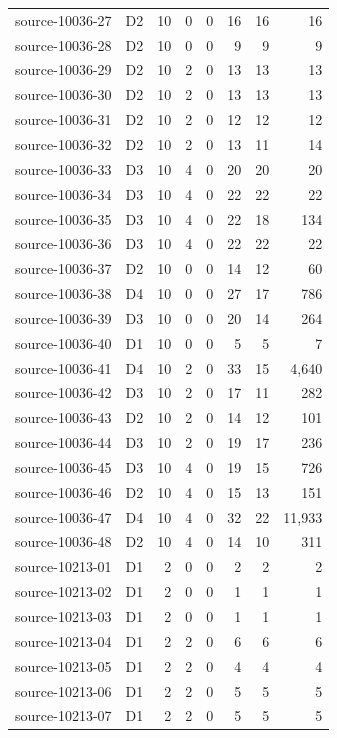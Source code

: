 \begin{longtable}{p{}lrrrrrr}
source-10036-27 & D2 & 10 & 0 & 0 & 16 & 16 & 16\\
source-10036-28 & D2 & 10 & 0 & 0 & 9 & 9 & 9\\
source-10036-29 & D2 & 10 & 2 & 0 & 13 & 13 & 13\\
source-10036-30 & D2 & 10 & 2 & 0 & 13 & 13 & 13\\
source-10036-31 & D2 & 10 & 2 & 0 & 12 & 12 & 12\\
source-10036-32 & D2 & 10 & 2 & 0 & 13 & 11 & 14\\
source-10036-33 & D3 & 10 & 4 & 0 & 20 & 20 & 20\\
source-10036-34 & D3 & 10 & 4 & 0 & 22 & 22 & 22\\
source-10036-35 & D3 & 10 & 4 & 0 & 22 & 18 & 134\\
source-10036-36 & D3 & 10 & 4 & 0 & 22 & 22 & 22\\
source-10036-37 & D2 & 10 & 0 & 0 & 14 & 12 & 60\\
source-10036-38 & D4 & 10 & 0 & 0 & 27 & 17 & 786\\
source-10036-39 & D3 & 10 & 0 & 0 & 20 & 14 & 264\\
source-10036-40 & D1 & 10 & 0 & 0 & 5 & 5 & 7\\
source-10036-41 & D4 & 10 & 2 & 0 & 33 & 15 & 4,640\\
source-10036-42 & D3 & 10 & 2 & 0 & 17 & 11 & 282\\
source-10036-43 & D2 & 10 & 2 & 0 & 14 & 12 & 101\\
source-10036-44 & D3 & 10 & 2 & 0 & 19 & 17 & 236\\
source-10036-45 & D3 & 10 & 4 & 0 & 19 & 15 & 726\\
source-10036-46 & D2 & 10 & 4 & 0 & 15 & 13 & 151\\
source-10036-47 & D4 & 10 & 4 & 0 & 32 & 22 & 11,933\\
source-10036-48 & D2 & 10 & 4 & 0 & 14 & 10 & 311\\
source-10213-01 & D1 & 2 & 0 & 0 & 2 & 2 & 2\\
source-10213-02 & D1 & 2 & 0 & 0 & 1 & 1 & 1\\
source-10213-03 & D1 & 2 & 0 & 0 & 1 & 1 & 1\\
source-10213-04 & D1 & 2 & 2 & 0 & 6 & 6 & 6\\
source-10213-05 & D1 & 2 & 2 & 0 & 4 & 4 & 4\\
source-10213-06 & D1 & 2 & 2 & 0 & 5 & 5 & 5\\
source-10213-07 & D1 & 2 & 2 & 0 & 5 & 5 & 5\\

\end{longtable}
